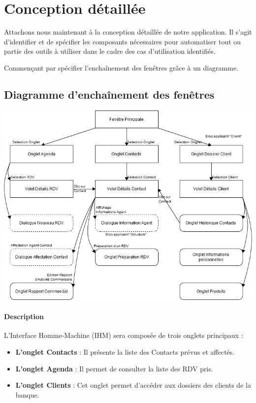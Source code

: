 
\section{Conception détaillée}

Attachons nous maintenant à la conception détaillée de notre application. Il s'agit
d'identifier et de spécifier les composants nécessaires pour automatiser tout ou
partie des outils à utiliser dans le cadre des cas d'utilisation identifiés.

Commençant par spécifier l'enchaînement des fenêtres grâce à un diagramme.

\subsection{Diagramme d'enchaînement des fenêtres}

\begin {center}
\includegraphics[width=\textwidth]{diagramme-edf.png}
\end {center}

\paragraph{Description}

L'Interface Homme-Machine (IHM) sera composée de trois onglets
principaux :

\begin{itemize}
\item \textbf{L'onglet Contacts} : Il présente la liste des Contacts prévus et affectés.
\item \textbf{L'onglet Agenda} : Il permet de consulter la liste des RDV pris.
\item \textbf{L'onglet Clients} : Cet onglet permet d'accéder aux dossiers des clients de la banque.
\end{itemize}

